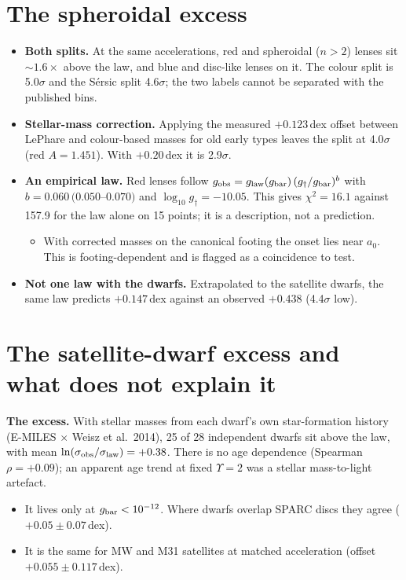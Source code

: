\documentclass[10pt]{article}
\begin{document}
\section{The spheroidal excess}
\begin{itemize}
\item \textbf{Both splits.} At the same accelerations, red and spheroidal ($n>2$) lenses sit $\sim1.6\times$ above the law, and blue and disc-like lenses on it. The colour split is 5.0$\sigma$ and the S\'ersic split 4.6$\sigma$; the two labels cannot be separated with the published bins.
\item \textbf{Stellar-mass correction.} Applying the measured $+0.123$\,dex offset between LePhare and colour-based masses for old early types leaves the split at 4.0$\sigma$ (red $A=1.451$). With $+0.20$\,dex it is 2.9$\sigma$.
\item \textbf{An empirical law.} Red lenses follow $g_{\rm obs}=g_{\rm law}(g_{\rm bar})\,(g_\dagger/g_{\rm bar})^{b}$ with $b=0.060\,(0.050$--$0.070)$ and $\log_{10}g_\dagger=-10.05$. This gives $\chi^2=16.1$ against 157.9 for the law alone on 15 points; it is a description, not a prediction.
  \begin{itemize}
  \item With corrected masses on the canonical footing the onset lies near $a_0$. This is footing-dependent and is flagged as a coincidence to test.
  \end{itemize}
\item \textbf{Not one law with the dwarfs.} Extrapolated to the satellite dwarfs, the same law predicts $+0.147$\,dex against an observed $+0.438$ (4.4$\sigma$ low).
\end{itemize}

\section{The satellite-dwarf excess and what does not explain it}
\textbf{The excess.} With stellar masses from each dwarf's own star-formation history (E-MILES $\times$ Weisz et al.\ 2014), 25 of 28 independent dwarfs sit above the law, with mean $\ln(\sigma_{\rm obs}/\sigma_{\rm law})=+0.38$. There is no age dependence (Spearman $\rho=+0.09$); an apparent age trend at fixed $\Upsilon=2$ was a stellar mass-to-light artefact.
\begin{itemize}
\item It lives only at $g_{\rm bar}<10^{-12}$. Where dwarfs overlap SPARC discs they agree ($+0.05\pm0.07$\,dex).
\item It is the same for MW and M31 satellites at matched acceleration (offset $+0.055\pm0.117$\,dex).
\end{itemize}
\end{document}
